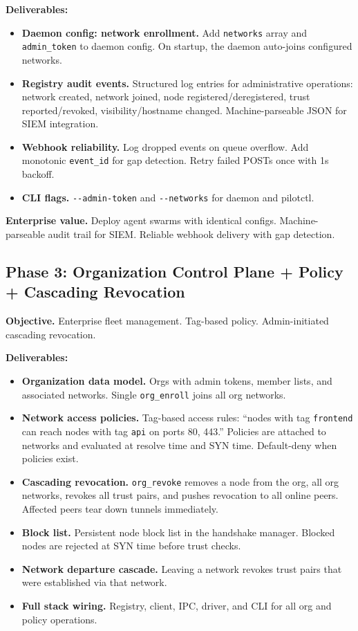 \documentclass[11pt,a4paper]{article}
\begin{document}
\textbf{Deliverables:}
\begin{itemize}
    \item \textbf{Daemon config: network enrollment.} Add \texttt{networks} array and \texttt{admin\_token} to daemon config. On startup, the daemon auto-joins configured networks.
    \item \textbf{Registry audit events.} Structured log entries for administrative operations: network created, network joined, node registered/deregistered, trust reported/revoked, visibility/hostname changed. Machine-parseable JSON for SIEM integration.
    \item \textbf{Webhook reliability.} Log dropped events on queue overflow. Add monotonic \texttt{event\_id} for gap detection. Retry failed POSTs once with 1s backoff.
    \item \textbf{CLI flags.} \texttt{-{}-admin-token} and \texttt{-{}-networks} for daemon and pilotctl.
\end{itemize}

\textbf{Enterprise value.} Deploy agent swarms with identical configs. Machine-parseable audit trail for SIEM. Reliable webhook delivery with gap detection.

\subsection{Phase 3: Organization Control Plane + Policy + Cascading Revocation}

\textbf{Objective.} Enterprise fleet management. Tag-based policy. Admin-initiated cascading revocation.

\textbf{Deliverables:}
\begin{itemize}
    \item \textbf{Organization data model.} Orgs with admin tokens, member lists, and associated networks. Single \texttt{org\_enroll} joins all org networks.
    \item \textbf{Network access policies.} Tag-based access rules: ``nodes with tag \texttt{frontend} can reach nodes with tag \texttt{api} on ports 80, 443.'' Policies are attached to networks and evaluated at resolve time and SYN time. Default-deny when policies exist.
    \item \textbf{Cascading revocation.} \texttt{org\_revoke} removes a node from the org, all org networks, revokes all trust pairs, and pushes revocation to all online peers. Affected peers tear down tunnels immediately.
    \item \textbf{Block list.} Persistent node block list in the handshake manager. Blocked nodes are rejected at SYN time before trust checks.
    \item \textbf{Network departure cascade.} Leaving a network revokes trust pairs that were established via that network.
    \item \textbf{Full stack wiring.} Registry, client, IPC, driver, and CLI for all org and policy operations.
\end{itemize}
\end{document}
